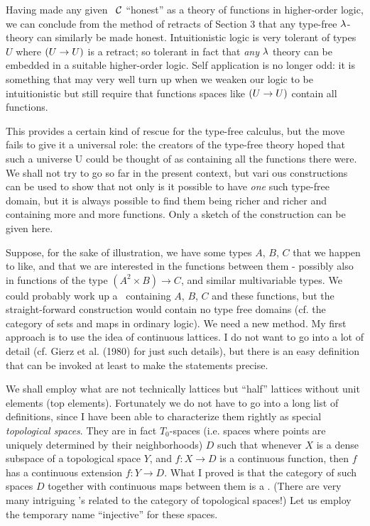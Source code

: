 Having made any given \ccc\ $\mathcal C$ ``honest'' as a theory of functions in higher-order logic, we can conclude from the method of retracts of Section 3 that any type-free $\lambda$-theory can similarly be made honest. Intuitionistic logic is very tolerant of types $U$ where $(U\rightarrow U)$ is a retract; so tolerant in fact that {\it any} $\lambda$ theory can be embedded in a suitable higher-order logic. Self application is no longer odd: it is something that may very well turn up when we weaken our logic to be intuitionistic but still require that functions spaces like $(U\rightarrow U)$ contain all functions.

This provides a certain kind of rescue for the type-free calculus, but the move fails to give it a universal role: the creators of the type-free theory hoped that such a universe U could be thought of as containing all the functions there were. We shall not try to go so far in the present context, but vari ous constructions can be used to show that not only is it possible to have {\it one} such type-free domain, but it is always possible to find them being richer and richer and containing more and more functions. Only a sketch of the construction can be given here.

Suppose, for the sake of illustration, we have some types $A$, $B$, $C$ that we happen to like, and that we are interested in the
functions between them - possibly also in functions of the type $(A^2 \times B) \to C$, and similar multivariable types. We could probably work up a \ccc\  containing $A$, $B$, $C$ and these functions, but the straight-forward construction would contain no type free domains (cf. the category of sets and maps in ordinary logic). We need a new method. My first approach is to use the idea of continuous lattices. I do not want to go into a lot of detail (cf. Gierz et al. (1980) for just such details), but there is an easy definition that can be invoked at least to make the statements precise.

We shall employ what are not technically lattices but ``half'' lattices without unit elements (top elements). Fortunately we do not have to go into a long list of definitions, since I have been able to characterize them rightly as special {\it topological spaces}. They are in fact $T_0$-spaces (i.e. spaces where points are uniquely determined by their neighborhoods) $D$ such that whenever $X$ is a dense subspace of a topological space $Y$, and $f : X\to D$ is a continuous function, then $f$ has a continuous extension $f:Y\to D$. What I proved is that the category of such spaces $D$ together with continuous maps between them is a \ccc . (There are very many intriguing \ccc's related to the category of topological spaces!) Let us employ the temporary name ``injective'' for these spaces.

